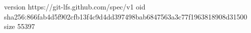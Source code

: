version https://git-lfs.github.com/spec/v1
oid sha256:866fab4d5f902cfb13f4c9d4dd397498bab6847563a3c77f1963818908d31500
size 55397
